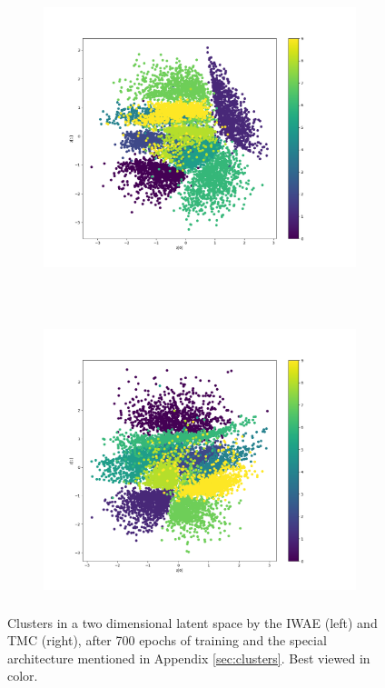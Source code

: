     \begin{figure}[h!]
        \centering
        \begin{subfigure}[t]{0.5\textwidth}
        \hspace*{-2cm}
            \centering
            \includegraphics[height=8cm]{../openreview/Figures/Scatter_plot_iwae.png}
        \end{subfigure}%
        ~ 
        \begin{subfigure}[t]{0.5\textwidth}
            \centering
            \includegraphics[height=8cm]{../openreview/Figures/Scatter_plot_tmc.png}
        \end{subfigure}
        \caption{Clusters in a two dimensional latent space by the IWAE (left) and TMC (right), after 700 epochs of training and the special architecture mentioned in Appendix \ref{sec:clusters}. Best viewed in color. }
        \label{fig:clusters}
    \end{figure}
    
    
